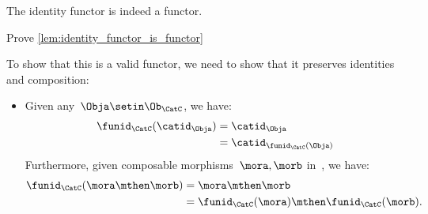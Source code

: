 \begin{lemma}
    \label{lem:identity_functor_is_functor}
    The identity functor is indeed a functor.
\end{lemma}

\begin{exercise}
    Prove \cref{lem:identity_functor_is_functor}
\end{exercise}
\begin{solution}
    To show that this is a valid functor, we need to show that it preserves identities and composition:
    \begin{itemize}
        \item Given any~$\Obja \setin \Ob_\CatC$, we have:
              \begin{equation*}
                  \begin{aligned}
                      \funid_{\CatC}(\catid_\Obja) & =\catid_\Obja \\
                                                   & =\catid_{\funid_{\CatC}(\Obja)}
                  \end{aligned}
              \end{equation*}
              Furthermore, given composable morphisms~$\mora,\morb$ in~\CatC, we have:
              \begin{equation*}
                  \begin{aligned}
                      \funid_{\CatC}(\mora\mthen\morb) & =\mora\mthen\morb \\
                                                       & =\funid_{\CatC}(\mora)\mthen \funid_{\CatC} (\morb).
                  \end{aligned}
              \end{equation*}
    \end{itemize}
\end{solution}
